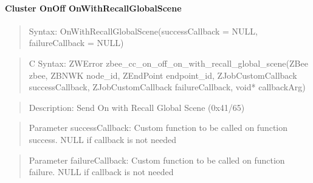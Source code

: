\paragraph{Cluster OnOff OnWithRecallGlobalScene}
\begin{quote}Syntax: OnWithRecallGlobalScene(successCallback = NULL, failureCallback = NULL)\end{quote}
\begin{quote}C Syntax: ZWError zbee\_cc\_on\_off\_on\_with\_recall\_global\_scene(ZBee zbee, ZBNWK node\_id, ZEndPoint endpoint\_id, ZJobCustomCallback successCallback, ZJobCustomCallback failureCallback, void* callbackArg)\end{quote}
\begin{quote}Description: Send On with Recall Global Scene (0x41/65)\end{quote}
\begin{quote}Parameter successCallback: Custom function to be called on function success. NULL if callback is not needed\end{quote}
\begin{quote}Parameter failureCallback: Custom function to be called on function failure. NULL if callback is not needed\end{quote}


